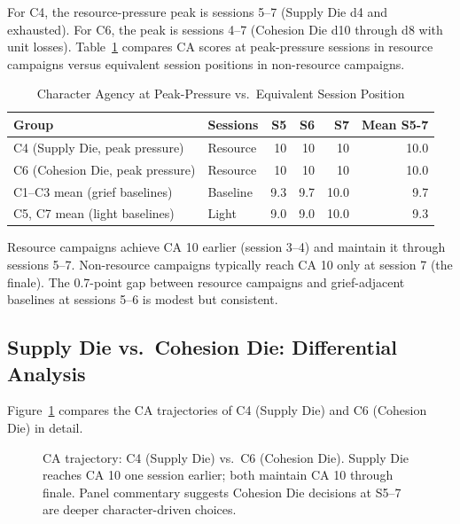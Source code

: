 For C4, the resource-pressure peak is sessions 5--7 (Supply Die d4 and exhausted).
For C6, the peak is sessions 4--7 (Cohesion Die d10 through d8 with unit losses).
Table~\ref{tab:peak-pressure} compares CA scores at peak-pressure sessions in resource
campaigns versus equivalent session positions in non-resource campaigns.

\begin{table}[t]
\caption{Character Agency at Peak-Pressure vs.\ Equivalent Session Position}
\label{tab:peak-pressure}
\begin{tabular}{@{}llrrrr@{}}
\toprule
Group & Sessions & S5 & S6 & S7 & Mean S5-7 \\
\midrule
C4 (Supply Die, peak pressure) & Resource & 10 & 10 & 10 & 10.0 \\
C6 (Cohesion Die, peak pressure) & Resource & 10 & 10 & 10 & 10.0 \\
C1--C3 mean (grief baselines) & Baseline & 9.3 & 9.7 & 10.0 & 9.7 \\
C5, C7 mean (light baselines) & Light & 9.0 & 9.0 & 10.0 & 9.3 \\
\bottomrule
\end{tabular}
\end{table}

Resource campaigns achieve CA 10 earlier (session 3--4) and maintain it through
sessions 5--7. Non-resource campaigns typically reach CA 10 only at session 7 (the
finale). The 0.7-point gap between resource campaigns and grief-adjacent baselines
at sessions 5--6 is modest but consistent.

\subsection{Supply Die vs.\ Cohesion Die: Differential Analysis}

Figure~\ref{fig:cohesion-advantage} compares the CA trajectories of C4 (Supply Die)
and C6 (Cohesion Die) in detail.

\begin{figure}[t]
  \centering
  \caption{CA trajectory: C4 (Supply Die) vs.\ C6 (Cohesion Die). Supply Die reaches CA 10
    one session earlier; both maintain CA 10 through finale. Panel commentary suggests
    Cohesion Die decisions at S5--7 are deeper character-driven choices.}
  \label{fig:cohesion-advantage}
\end{figure}

